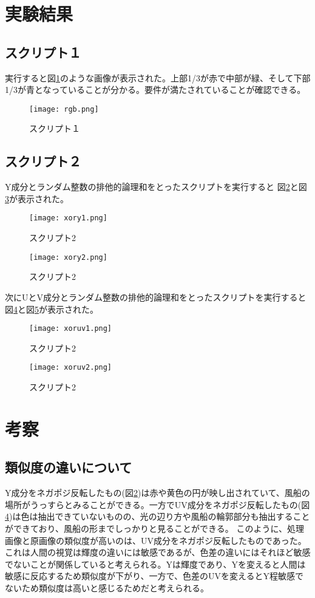 \documentclass[a4j]{jsarticle}
\begin{document}
\section{実験結果}
\subsection{スクリプト１}
実行すると図\ref{pic:rgb}のような画像が表示された。上部1/3が赤で中部が緑、そして下部1/3が青となっていることが分かる。要件が満たされていることが確認できる。
\begin{figure}
  \centering
  \texttt{[image: rgb.png]}
  \caption{スクリプト１}
  \label{pic:rgb}
\end{figure}

\subsection{スクリプト２}
Y成分とランダム整数の排他的論理和をとったスクリプトを実行すると
図\ref{pic:xor1}と図\ref{pic:xor2}が表示された。\\
\begin{figure}
  \centering
  \texttt{[image: xory1.png]}
  \caption{スクリプト2}
  \label{pic:xor1}
\end{figure}
\begin{figure}
  \centering
  \texttt{[image: xory2.png]}
  \caption{スクリプト2}
  \label{pic:xor2}
\end{figure}


次にUとV成分とランダム整数の排他的論理和をとったスクリプトを実行すると
図\ref{pic:xouv1}と図\ref{pic:xouv2}が表示された。\\

\begin{figure}
  \centering
  \texttt{[image: xoruv1.png]}
  \caption{スクリプト2}
  \label{pic:xouv1}
\end{figure}
\begin{figure}
  \centering
  \texttt{[image: xoruv2.png]}
  \caption{スクリプト2}
  \label{pic:xouv2}
\end{figure}



\section{考察}
\subsection{類似度の違いについて}
Y成分をネガポジ反転したもの(図\ref{pic:xor1})は赤や黄色の円が映し出されていて、風船の場所がうっすらとみることができる。一方でUV成分をネガポジ反転したもの(図\ref{pic:xouv1})は色は抽出できていないものの、光の辺り方や風船の輪郭部分も抽出することができており、風船の形までしっかりと見ることができる。
このように、処理画像と原画像の類似度が高いのは、UV成分をネガポジ反転したものであった。これは人間の視覚は輝度の違いには敏感であるが、色差の違いにはそれほど敏感でないことが関係していると考えられる。Yは輝度であり、Yを変えると人間は敏感に反応するため類似度が下がり、一方で、色差のUVを変えるとY程敏感でないため類似度は高いと感じるためだと考えられる。
\end{document}
